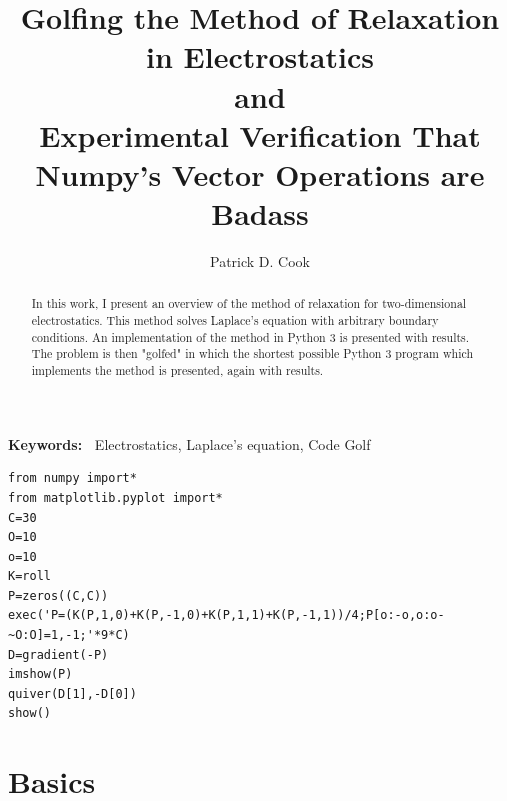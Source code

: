 \documentclass[12pt,twocolumn]{article}
\providecommand{\keywords}[1]{\textbf{\textbf{Keywords:~}} #1}
\begin{document}
\title{%
  Golfing the Method of Relaxation in Electrostatics \\
  \large and \\
    Experimental Verification That Numpy's Vector Operations are Badass}
\author{Patrick D. Cook}
\date{}
\begin{titlingpage}
\maketitle
\begin{abstract}
In this work, I present an overview of the method of relaxation for two-dimensional electrostatics. This method solves Laplace's equation with arbitrary boundary conditions. An implementation of the method in Python $3$ is presented with results. The problem is then "golfed" in which the shortest possible Python $3$ program which implements the method is presented, again with results.
\end{abstract}
\keywords{Electrostatics, Laplace's equation, Code Golf}
\begin{verbatim}
from numpy import*
from matplotlib.pyplot import*
C=30
O=10
o=10
K=roll
P=zeros((C,C))
exec('P=(K(P,1,0)+K(P,-1,0)+K(P,1,1)+K(P,-1,1))/4;P[o:-o,o:o-~O:O]=1,-1;'*9*C)
D=gradient(-P)
imshow(P)
quiver(D[1],-D[0])
show()
\end{verbatim}
\end{titlingpage}
\newpage
\twocolumn
\section{Basics}
\end{document}
